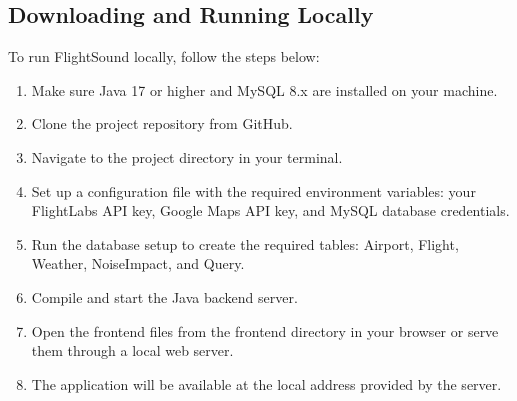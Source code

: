 \documentclass[12pt]{article}
\begin{document}
\subsection{Downloading and Running Locally}
To run FlightSound locally, follow the steps below:

\begin{enumerate}
\item Make sure Java 17 or higher and MySQL 8.x are installed on your machine.
\item Clone the project repository from GitHub.
\item Navigate to the project directory in your terminal.
\item Set up a configuration file with the required environment variables: your FlightLabs API key, Google Maps API key, and MySQL database credentials.
\item Run the database setup to create the required tables: Airport, Flight, Weather, NoiseImpact, and Query.
\item Compile and start the Java backend server.
\item Open the frontend files from the frontend directory in your browser or serve them through a local web server.
\item The application will be available at the local address provided by the server.
\end{enumerate}
\end{document}
